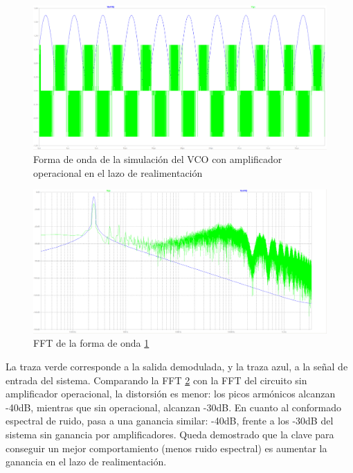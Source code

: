\documentclass[12pt]{report} %
\begin{document}
	\begin{figure}[H]
		\includegraphics[width=\textwidth]{sim-vco-closed-opamp-waveform.png}
		\caption[Forma de onda de la simulación del VCO con amplificador operacional en el lazo de realimentación]{Forma de onda de la simulación del VCO con amplificador operacional en el lazo de realimentación}
		\label{fig:sim-vco-closed-opamp-waveform.png}
	\end{figure}

	\begin{figure}[H]
		\includegraphics[width=\textwidth]{sim-vco-closed-opamp-fft.png}
		\caption[FFT de la forma de onda \ref{fig:sim-vco-closed-opamp-waveform.png}]{FFT de la forma de onda \ref{fig:sim-vco-closed-opamp-waveform.png}}
		\label{fig:sim-vco-closed-opamp-fft.png}
	\end{figure}

	La traza verde corresponde a la salida demodulada, y la traza azul, a la señal de entrada del sistema. Comparando la FFT \ref{fig:sim-vco-closed-opamp-fft.png} con la FFT del circuito sin amplificador operacional, la distorsión es menor: los picos armónicos alcanzan -40dB, mientras que sin operacional, alcanzan -30dB. En cuanto al conformado espectral de ruido, pasa a una ganancia similar: -40dB, frente a los -30dB del sistema sin ganancia por amplificadores. Queda demostrado que la clave para conseguir un mejor comportamiento (menos ruido espectral) es aumentar la ganancia en el lazo de realimentación.
\end{document}
